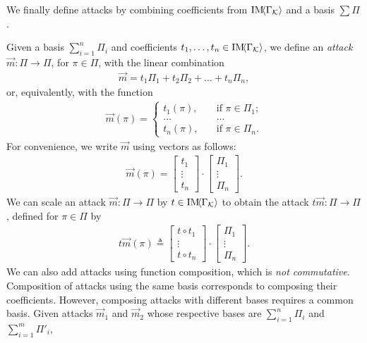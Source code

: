 {We finally define attacks by combining coefficients from $\text{IM}\!{{\left<\Gamma_{\mathcal{K}}\right>}}$ and a basis $\sum\Pi$.
\begin{definition}[Attack]
  \label{def:Attack}
Given a basis $\sum_{i=1}^n\Pi_i$ and coefficients $t_1, \ldots, t_n\in\text{IM}\!{{\left<\Gamma_{\mathcal{K}}\right>}}$, 
we define an \emph{attack} $\vec{m}\colon \Pi\rightarrow \Pi$, for $\pi\in \Pi$, with the linear combination
\begin{align}
  \vec{m}=t_1\Pi_1 + t_2\Pi_2 + \ldots + t_n\Pi_n,
\end{align} 
or, equivalently, with the function
\begin{align}
  \label{eq:AttackVector}
  \vec{m}(\pi)=
    \begin{cases}
      t_1(\pi), &\quad\text{if $\pi\in \Pi_1$;}\\
      \ldots&\quad\ldots\\
      t_n(\pi), &\quad\text{if $\pi\in \Pi_n$.}
    \end{cases}
\end{align}
For convenience, we write $\vec{m}$ using vectors as follows: 
\begin{align}
  \vec{m}(\pi)=
  \begin{bmatrix}
    t_{1} \\
    \vdots \\
    t_{n}
  \end{bmatrix}
  \cdot
  \begin{bmatrix}
    \Pi_{1} \\
    \vdots \\
    \Pi_{n}
  \end{bmatrix}.
\end{align} 
We can scale an attack $\vec{m}\colon \Pi\rightarrow \Pi$ by $t\in \text{IM}\!{{\left<\Gamma_{\mathcal{K}}\right>}}$ to obtain the attack $t\vec{m}\colon \Pi\rightarrow \Pi$, defined for $\pi\in \Pi$ by
\begin{align}
  t\vec{m}(\pi)\triangleq
  \begin{bmatrix}
    t\circ t_{1} \\
    \vdots \\
    t\circ t_{n}
  \end{bmatrix}
  \cdot
  \begin{bmatrix}
    \Pi_{1} \\
    \vdots \\
    \Pi_{n}
  \end{bmatrix}.
\end{align} 
We can also add attacks using function composition, which is \emph{not commutative}. Composition of attacks using the same basis corresponds to composing their coefficients. However, composing attacks with different bases requires a common basis. Given attacks $\vec{m}_1$ and $\vec{m}_2$ whose respective bases are $\sum_{i=1}^n\Pi_i$ and $\sum_{i=1}^m\Pi'_i$, 

\end{definition}}
